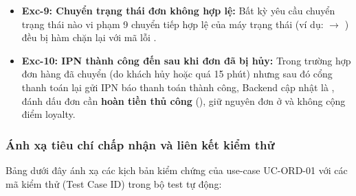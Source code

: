 \begin{itemize}[leftmargin=1.5em]
  \item \textbf{Exc-9: Chuyển trạng thái đơn không hợp lệ:} Bất kỳ yêu cầu chuyển trạng thái nào vi phạm 9 chuyển tiếp hợp lệ của máy trạng thái (ví dụ:  $\rightarrow$ ) đều bị hàm  chặn lại với mã lỗi .
  \item \textbf{Exc-10: IPN thành công đến sau khi đơn đã bị hủy:} Trong trường hợp đơn hàng đã chuyển  (do khách hủy hoặc quá 15 phút) nhưng sau đó cổng thanh toán lại gửi IPN báo thanh toán thành công, Backend cập nhật  là , đánh dấu đơn cần \textbf{hoàn tiền thủ công} (), giữ nguyên đơn ở  và không cộng điểm loyalty.
\end{itemize}

\subsubsection{Ánh xạ tiêu chí chấp nhận và liên kết kiểm thử}

Bảng dưới đây ánh xạ các kịch bản kiểm chứng của use-case UC-ORD-01 với các mã kiểm thử (Test Case ID) trong bộ test tự động:

